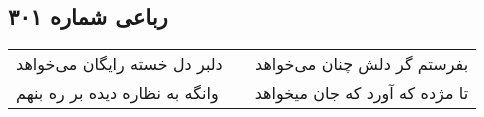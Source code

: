 \begin{center}
\section*{رباعی شماره ۳۰۱}
\label{sec:sh301}
\begin{longtable}{l p{0.5cm} r}
دلبر دل خسته رایگان می‌خواهد
&&
بفرستم گر دلش چنان می‌خواهد
\\
وانگه به نظاره دیده بر ره بنهم
&&
تا مژده که آورد که جان میخواهد
\\
\end{longtable}
\end{center}
